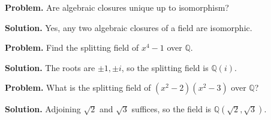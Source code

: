 \begin{example}\label{ex:sec3-8}
\textbf{Problem.} Are algebraic closures unique up to isomorphism?

\textbf{Solution.} Yes, any two algebraic closures of a field are isomorphic.
\end{example}

\begin{example}\label{ex:sec3-9}
\textbf{Problem.} Find the splitting field of $x^4-1$ over $\mathbb{Q}$.

\textbf{Solution.} The roots are $\pm1,\pm i$, so the splitting field is $\mathbb{Q}(i)$.
\end{example}

\begin{example}\label{ex:sec3-10}
\textbf{Problem.} What is the splitting field of $(x^2-2)(x^2-3)$ over $\mathbb{Q}$?

\textbf{Solution.} Adjoining $\sqrt{2}$ and $\sqrt{3}$ suffices, so the field is $\mathbb{Q}(\sqrt{2},\sqrt{3})$.
\end{example}
